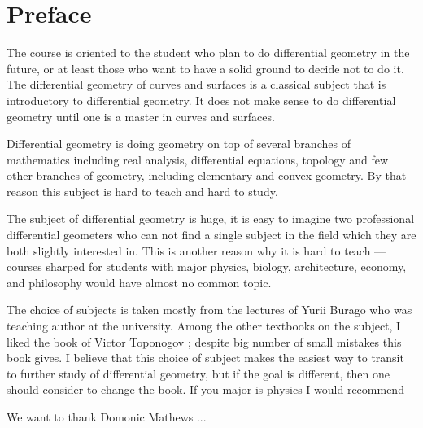 \section*{Preface}

The course is oriented to the student who plan to do differential geometry in the future,
or at least those who want to have a solid ground to decide not to do it.
The differential geometry of curves and surfaces is a classical subject that is introductory to differential geometry.
It does not make sense to do differential geometry until one is a master in curves and surfaces.

Differential geometry is doing geometry on top of several branches of mathematics including real analysis, differential equations, topology and few other branches of geometry, including elementary and convex geometry.
By that reason this subject is hard to teach and hard to study.

The subject of differential geometry is huge,
it is easy to imagine two professional differential geometers who can not find a single subject in the field which they are both slightly interested in.
This is another reason why it is hard to teach --- courses sharped for students with major physics, biology, architecture, economy, and philosophy would have almost no common topic.

The choice of subjects is taken mostly from the lectures of Yurii Burago who was teaching author at the university.
Among the other textbooks on the subject, I liked the book of Victor Toponogov \cite{toponogov};
despite big number of small mistakes this book gives.
I believe that this choice of subject makes the easiest way to transit to further study of differential geometry, but if the goal is different, then one should consider to change the book.
If you major is physics I would recommend 

We want to thank Domonic Mathews ...
